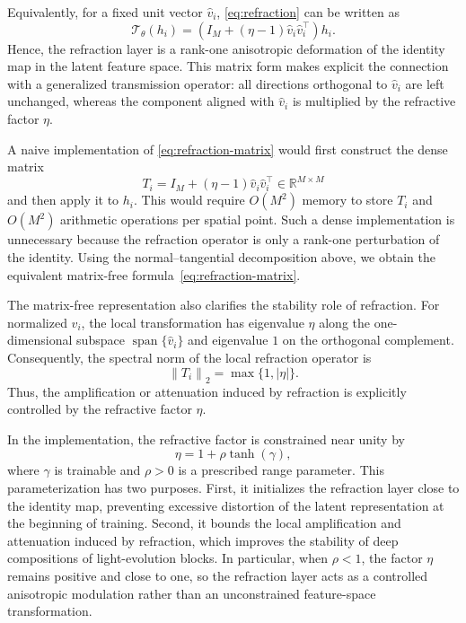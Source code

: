 \documentclass{article}
\newcommand{\R}{\mathbb{R}}
\newcommand{\cT}{\mathcal{T}}
\newcommand{\norm}[1]{\left\lVert #1\right\rVert}
\begin{document}
Equivalently, for a fixed unit vector $\widehat v_i$, \eqref{eq:refraction} can be written as
\begin{equation}
    \cT_\theta(h_i)
    =
    \left(I_M + (\eta-1)\widehat v_i \widehat v_i^\top\right)h_i.
    \label{eq:refraction-matrix}
\end{equation}
Hence, the refraction layer is a rank-one anisotropic deformation of the identity map in the latent feature space. This matrix form makes explicit the connection with a generalized transmission operator: all directions orthogonal to $\widehat v_i$ are left unchanged, whereas the component aligned with $\widehat v_i$ is multiplied by the refractive factor $\eta$.

A naive implementation of \eqref{eq:refraction-matrix} would first construct the dense matrix
\begin{equation}
    T_i = I_M + (\eta-1)\widehat v_i\widehat v_i^\top
    \in \R^{M\times M}
\end{equation}
and then apply it to $h_i$. This would require $O(M^2)$ memory to store $T_i$ and $O(M^2)$ arithmetic operations per spatial point. Such a dense implementation is unnecessary because the refraction operator is only a rank-one perturbation of the identity. Using the normal--tangential decomposition above, we obtain the equivalent matrix-free formula~\eqref{eq:refraction-matrix}.

The matrix-free representation also clarifies the stability role of refraction. For normalized $\widehat v_i$, the local transformation has eigenvalue $\eta$ along the one-dimensional subspace $\operatorname{span}\{\widehat v_i\}$ and eigenvalue $1$ on the orthogonal complement. Consequently, the spectral norm of the local refraction operator is
\begin{equation}
    \norm{T_i}_2 = \max\{1,|\eta|\}.
\end{equation}
Thus, the amplification or attenuation induced by refraction is explicitly controlled by the refractive factor $\eta$.

In the implementation, the refractive factor is constrained near unity by
\begin{equation}
    \eta = 1 + \rho\tanh(\gamma),
    \label{eq:eta-param}
\end{equation}
where $\gamma$ is trainable and $\rho>0$ is a prescribed range parameter. This parameterization has two purposes. First, it initializes the refraction layer close to the identity map, preventing excessive distortion of the latent representation at the beginning of training. Second, it bounds the local amplification and attenuation induced by refraction, which improves the stability of deep compositions of light-evolution blocks. In particular, when $\rho<1$, the factor $\eta$ remains positive and close to one, so the refraction layer acts as a controlled anisotropic modulation rather than an unconstrained feature-space transformation.
\end{document}
